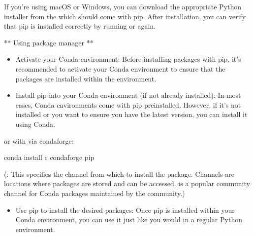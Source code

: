 \documentclass[letterpaper,10pt,english]{sphinxmanual}
\begin{document}
\sphinxAtStartPar
If you’re using macOS or Windows, you can download the appropriate Python installer from the  which should come with pip.
After installation, you can verify that pip is installed correctly by running  or  again.

\sphinxAtStartPar
** Using  package manager **
\begin{itemize}
\item {} 
\sphinxAtStartPar
Activate your Conda environment: Before installing packages with pip, it’s recommended to activate your Conda environment to ensure that the packages are installed within the environment.

\end{itemize}
\begin{itemize}
\item {} 
\sphinxAtStartPar
Install pip into your Conda environment (if not already installed): In most cases, Conda environments come with pip pre\sphinxhyphen{}installed. However, if it’s not installed or you want to ensure you have the latest version, you can install it using Conda.

\end{itemize}

\sphinxAtStartPar
or with  via conda\sphinxhyphen{}forge:

\begin{sphinxVerbatim}[commandchars=\\\{\}]

\end{sphinxVerbatim}

\sphinxAtStartPar
conda install \sphinxhyphen{}c conda\sphinxhyphen{}forge pip

\sphinxAtStartPar
(: This specifies the channel from which to install the package. Channels are locations where packages are stored and can be accessed.  is a popular community channel for Conda packages maintained by the community.)
\begin{itemize}
\item {} 
\sphinxAtStartPar
Use pip to install the desired packages: Once pip is installed within your Conda environment, you can use it just like you would in a regular Python environment.

\end{itemize}
\end{document}
